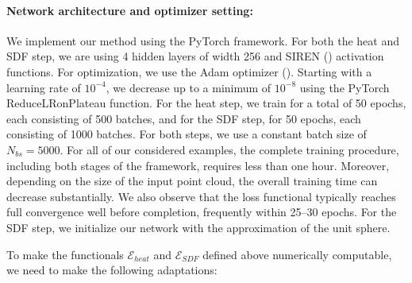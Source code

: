 \documentclass[12pt,openany]{book}
\theoremstyle{plainnormal}
\theoremstyle{remark}
\begin{document}
\paragraph{Network architecture and optimizer setting:} We implement our method using the PyTorch framework. For both the heat and SDF step, we are using 4 hidden layers of width 256 and SIREN (\cite{sitzmann2020implicitneuralrepresentationsperiodic}) activation functions. For optimization, we use the Adam optimizer (\cite{kingma2017adammethodstochasticoptimization}). Starting with a learning rate of $10^{-4}$, we decrease up to a minimum of $10^{-8}$ using the PyTorch ReduceLRonPlateau function. For the heat step, we train for a total of 50 epochs, each consisting of 500 batches, and for the SDF step, for 50 epochs, each consisting of 1000 batches. For both steps, we use a constant batch size of $N_{bs} = 5000.$ For all of our considered examples, the complete training procedure, including both stages of the framework, requires less than one hour. Moreover, depending on the size of the input point cloud, the overall training time can decrease substantially. We also observe that the loss functional typically reaches full convergence well before completion, frequently within 25–30 epochs. For the SDF step, we initialize our network with the approximation of the unit sphere. \par
To make the functionals $\mathcal{E}_{heat}$ and $\mathcal{E}_{SDF}$ defined above numerically computable, we need to make the following adaptations:
\end{document}
